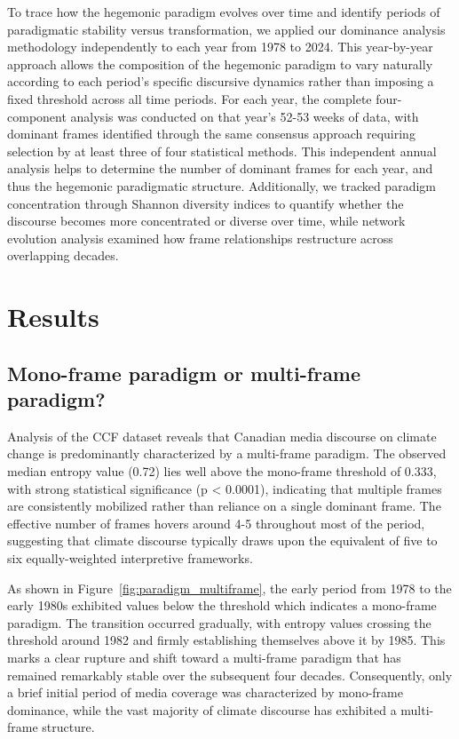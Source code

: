 \documentclass[12pt]{article}
\begin{document}
To trace how the hegemonic paradigm evolves over time and identify periods of paradigmatic stability versus transformation, we applied our dominance analysis methodology independently to each year from 1978 to 2024. This year-by-year approach allows the composition of the hegemonic paradigm to vary naturally according to each period's specific discursive dynamics rather than imposing a fixed threshold across all time periods. For each year, the complete four-component analysis was conducted on that year's 52-53 weeks of data, with dominant frames identified through the same consensus approach requiring selection by at least three of four statistical methods. This independent annual analysis helps to determine the number of dominant frames for each year, and thus the hegemonic paradigmatic structure. Additionally, we tracked paradigm concentration through Shannon diversity indices to quantify whether the discourse becomes more concentrated or diverse over time, while network evolution analysis examined how frame relationships restructure across overlapping decades.

\newpage
\section{Results}

\subsection{Mono-frame paradigm or multi-frame paradigm?}

Analysis of the CCF dataset reveals that Canadian media discourse on climate change is predominantly characterized by a multi-frame paradigm. The observed median entropy value (0.72) lies well above the mono-frame threshold of 0.333, with strong statistical significance (p < 0.0001), indicating that multiple frames are consistently mobilized rather than reliance on a single dominant frame. The effective number of frames hovers around 4-5 throughout most of the period, suggesting that climate discourse typically draws upon the equivalent of five to six equally-weighted interpretive frameworks.

As shown in Figure~\ref{fig:paradigm_multiframe}, the early period from 1978 to the early 1980s exhibited values below the threshold which indicates a mono-frame paradigm. The transition occurred gradually, with entropy values crossing the threshold around 1982 and firmly establishing themselves above it by 1985. This marks a clear rupture and shift toward a multi-frame paradigm that has remained remarkably stable over the subsequent four decades. Consequently, only a brief initial period of media coverage was characterized by mono-frame dominance, while the vast majority of climate discourse has exhibited a multi-frame structure.
\end{document}
